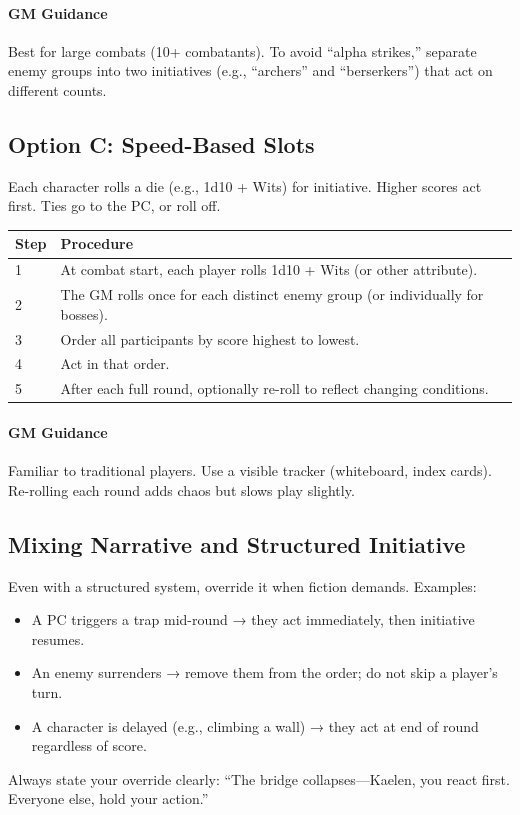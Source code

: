 \paragraph{GM Guidance}
Best for large combats (10+ combatants). To avoid “alpha strikes,” separate enemy groups into two initiatives (e.g., “archers” and “berserkers”) that act on different counts.

\subsection{Option C: Speed-Based Slots}
\label{subsec:speed-initiative}
Each character rolls a die (e.g., 1d10 + Wits) for initiative. Higher scores act first. Ties go to the PC, or roll off.

\begin{table}[h]
\centering
\small
\begin{tabularx}{\textwidth}{lX}
\toprule
\textbf{Step} & \textbf{Procedure} \\
\midrule
1 & At combat start, each player rolls 1d10 + Wits (or other attribute). \\
2 & The GM rolls once for each distinct enemy group (or individually for bosses). \\
3 & Order all participants by score highest to lowest. \\
4 & Act in that order. \\
5 & After each full round, optionally re-roll to reflect changing conditions. \\
\bottomrule
\end{tabularx}
\end{table}

\paragraph{GM Guidance}
Familiar to traditional players. Use a visible tracker (whiteboard, index cards). Re-rolling each round adds chaos but slows play slightly.

\subsection{Mixing Narrative and Structured Initiative}
\label{subsec:mixing-initiative}
Even with a structured system, override it when fiction demands. Examples:
\begin{itemize}
\item A PC triggers a trap mid-round → they act immediately, then initiative resumes.
\item An enemy surrenders → remove them from the order; do not skip a player’s turn.
\item A character is delayed (e.g., climbing a wall) → they act at end of round regardless of score.
\end{itemize}
Always state your override clearly: “The bridge collapses—Kaelen, you react first. Everyone else, hold your action.”

